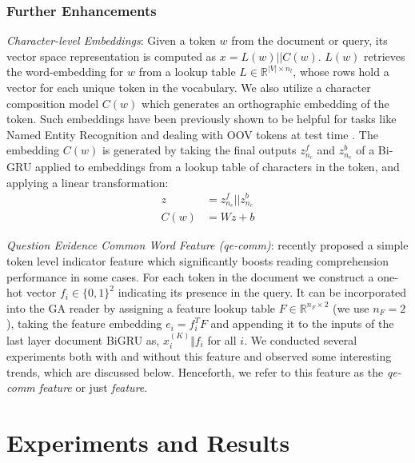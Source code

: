 \documentclass[11pt,a4paper]{article}
\begin{document}
\subsubsection{Further Enhancements}
\label{sec:tricks}
\emph{Character-level Embeddings}: Given a token $w$ from the document or query, its vector space representation is computed as $x=L(w) || C(w)$. $L(w)$ retrieves the word-embedding for $w$ from a lookup table $L \in \mathbb{R}^{|V|\times n_l}$, whose rows hold a vector for each unique token in the vocabulary. We also utilize a character composition model $C(w)$ which generates an orthographic embedding of the token. Such embeddings have been previously shown to be helpful for tasks like Named Entity Recognition \citep{yang2016multi} and dealing with OOV tokens at test time \citep{dhingra2016tweet2vec}. The embedding $C(w)$ is generated by taking the final outputs $z^f_{n_c}$ and $z^b_{n_c}$ of a Bi-GRU applied to embeddings from a lookup table of characters in the token, and applying a linear transformation:
\begin{align*}
z &= z^f_{n_c} || z^b_{n_c}\\
C(w) &= W z + b
\end{align*}

\emph{Question Evidence Common Word Feature (qe-comm)}: \citet{li2016dataset} recently proposed a simple token level indicator feature which significantly boosts reading comprehension performance in some cases. For each token in the document we construct a one-hot vector $f_i \in \{0,1\}^2$ indicating its presence in the query. It can be incorporated into the GA reader by assigning a feature lookup table $F \in \mathbb{R}^{n_F \times 2}$ (we use $n_F=2$), taking the feature embedding $e_i=f_i^T F$ and appending it to the inputs of the last layer document BiGRU as, $x_i^{(K)} \Vert f_i$ for all $i$. We conducted several experiments both with and without this feature and observed some interesting trends, which are discussed below. Henceforth, we refer to this feature as the \textit{qe-comm feature} or just \textit{feature}.

\section{Experiments and Results}
\label{sec:results}
\end{document}
